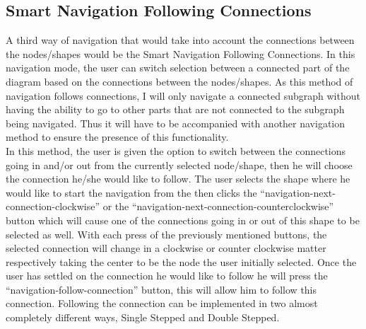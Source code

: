 \subsection{Smart Navigation Following Connections}
\par \noindent
A third way of navigation that would take into account the connections between the nodes/shapes would be the Smart Navigation Following Connections. In this navigation mode, the user can switch selection between a connected part of the diagram based on the connections between the nodes/shapes. As this method of navigation follows connections, I will only navigate a connected subgraph without having the ability to go to other parts that are not connected to the subgraph being navigated. Thus it will have to be accompanied with another navigation method to ensure the presence of this functionality.\\
In this method, the user is given the option to switch between the connections going in and/or out from the currently selected node/shape, then he will choose the connection he/she would like to follow. The user selects the shape where he would like to start the navigation from the then clicks the ``navigation-next-connection-clockwise'' or the ``navigation-next-connection-counterclockwise'' button which will cause one of the connections going in or out of this shape to be selected as well. With each press of the previously mentioned buttons, the selected connection will change in a clockwise or counter clockwise matter respectively taking the center to be the node the user initially selected. Once the user has settled on the connection he would like to follow he will press the ``navigation-follow-connection'' button, this will allow him to follow this connection. Following the connection can be implemented in two almost completely different ways, Single Stepped and Double Stepped.


